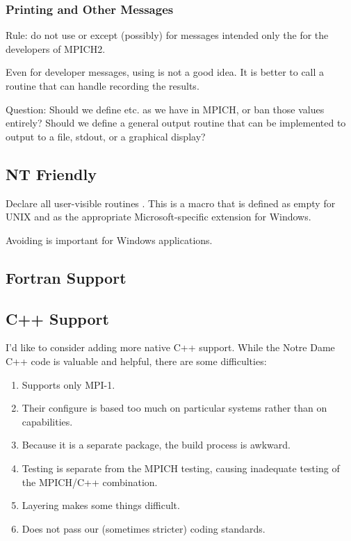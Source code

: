 \documentclass{article}
\begin{document}
\subsubsection{Printing and Other Messages}
Rule: do not use  or  except (possibly) for
messages intended only the for the developers of MPICH2.

Even for developer messages, using  is not a good idea.
It is better to call a routine that can handle recording the results.


Question: Should we define  etc. as we have in MPICH, or
ban those values entirely?  Should we define a general output routine
that can be implemented to output to a file, stdout, or a graphical display?

\subsection{NT Friendly}

Declare all user-visible routines .  This is a
macro that is defined as empty for UNIX and as the appropriate
Microsoft-specific extension for Windows.

Avoiding  is important for Windows applications.

\subsection{Fortran Support}

\subsection{C++ Support}

I'd like to consider adding more native C++ support.  While the Notre
Dame C++ code is valuable and helpful, there are some difficulties:
\begin{enumerate}
\item Supports only MPI-1.
\item Their configure is based too much on particular systems rather than on
capabilities. 
\item Because it is a separate package, the build process is awkward.
\item Testing is separate from the MPICH testing, causing inadequate
testing of the MPICH/C++ combination.
\item Layering makes some things difficult. 
\item Does not pass our (sometimes stricter) coding standards. 
\end{enumerate}
\end{document}

